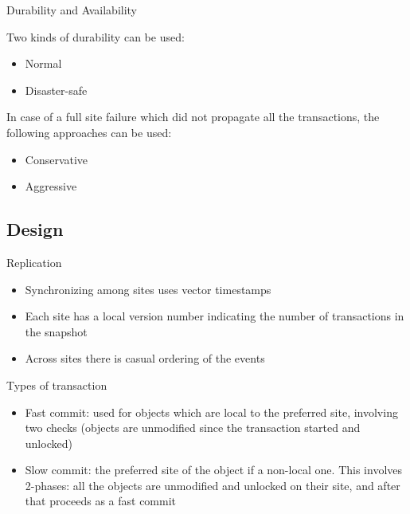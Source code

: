 \documentclass{beamer}
\begin{document}
		\begin{frame}{Durability and Availability}
		
		Two kinds of durability can be used:
		
		\begin{itemize}
		\item Normal
		\item Disaster-safe
		\end{itemize}		
		
		\pause			
		
		In case of a full site failure which did not propagate all the transactions, the following approaches can be used:
		
		\begin{itemize}
		\item Conservative
		\item Aggressive
		\end{itemize}			
		
		\end{frame} 	
		
			 	
	\subsection{Design}
	 	
	 	
		\begin{frame}{Replication}
				
		\begin{itemize}
		
		\item Synchronizing among sites uses vector timestamps
		\item Each site has a local version number indicating the number of transactions in the snapshot
		\item Across sites there is casual ordering of the events
		
		\end{itemize}
		
		\end{frame}	 	
		

		\begin{frame}{Types of transaction}
		
		\begin{itemize}[<+->]
		
		\item Fast commit: used for objects which are local to the preferred site, involving two checks (objects are unmodified since the transaction started and unlocked)
		
		\item Slow commit: the preferred site of the object if a non-local one. This involves 2-phases: all the objects are unmodified and unlocked on their site, and after that proceeds as a fast commit
		
		\end{itemize}

		\end{frame}
 	
\end{document}
